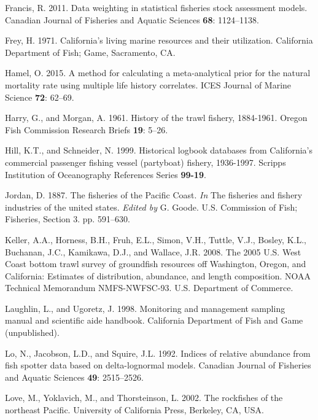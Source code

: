 \documentclass[12pt,]{article}
\begin{document}
\hypertarget{ref-Francis2011}{}
Francis, R. 2011. Data weighting in statistical fisheries stock
assessment models. Canadian Journal of Fisheries and Aquatic Sciences
\textbf{68}: 1124--1138.

\hypertarget{ref-Frey1971}{}
Frey, H. 1971. California's living marine resources and their
utilization. California Department of Fish; Game, Sacramento, CA.

\hypertarget{ref-Hamel2015}{}
Hamel, O. 2015. A method for calculating a meta-analytical prior for the
natural mortality rate using multiple life history correlates. ICES
Journal of Marine Science \textbf{72}: 62--69.

\hypertarget{ref-Harry1961}{}
Harry, G., and Morgan, A. 1961. History of the trawl fishery, 1884-1961.
Oregon Fish Commission Research Briefs \textbf{19}: 5--26.

\hypertarget{ref-Hill1999}{}
Hill, K.T., and Schneider, N. 1999. Historical logbook databases from
California's commercial passenger fishing vessel (partyboat) fishery,
1936-1997. Scripps Institution of Oceanography References Series
\textbf{99-19}.

\hypertarget{ref-Jordan1887}{}
Jordan, D. 1887. The fisheries of the Pacific Coast. \emph{In} The
fisheries and fishery industries of the united states. \emph{Edited by}
G. Goode. U.S. Commission of Fish; Fisheries, Section 3. pp. 591--630.

\hypertarget{ref-Keller2008}{}
Keller, A.A., Horness, B.H., Fruh, E.L., Simon, V.H., Tuttle, V.J.,
Bosley, K.L., Buchanan, J.C., Kamikawa, D.J., and Wallace, J.R. 2008.
The 2005 U.S. West Coast bottom trawl survey of groundfish resources off
Washington, Oregon, and California: Estimates of distribution,
abundance, and length composition. NOAA Technical Memorandum
NMFS-NWFSC-93. U.S. Department of Commerce.

\hypertarget{ref-Laughlin1998}{}
Laughlin, L., and Ugoretz, J. 1998. Monitoring and management sampling
manual and scientific aide handbook. California Department of Fish and
Game (unpublished).

\hypertarget{ref-Lo1992}{}
Lo, N., Jacobson, L.D., and Squire, J.L. 1992. Indices of relative
abundance from fish spotter data based on delta-lognormal models.
Canadian Journal of Fisheries and Aquatic Sciences \textbf{49}:
2515--2526.

\hypertarget{ref-Love2002}{}
Love, M., Yoklavich, M., and Thorsteinson, L. 2002. The rockfishes of
the northeast Pacific. University of California Press, Berkeley, CA,
USA.
\end{document}
